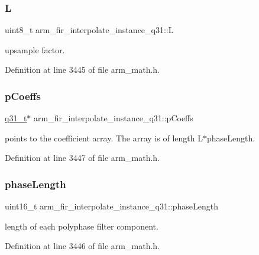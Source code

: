 \subsubsection{\texorpdfstring{L}{L}}
{\footnotesize\ttfamily uint8\+\_\+t arm\+\_\+fir\+\_\+interpolate\+\_\+instance\+\_\+q31\+::L}

upsample factor. 

Definition at line 3445 of file arm\+\_\+math.\+h.

\mbox{\label{structarm__fir__interpolate__instance__q31_afa719433687e1936ec3403d0d32f06e6}} 
\subsubsection{\texorpdfstring{p\+Coeffs}{pCoeffs}}
{\footnotesize\ttfamily \hyperlink{arm__math_8h_adc89a3547f5324b7b3b95adec3806bc0}{q31\+\_\+t}$\ast$ arm\+\_\+fir\+\_\+interpolate\+\_\+instance\+\_\+q31\+::p\+Coeffs}

points to the coefficient array. The array is of length L$\ast$phase\+Length. 

Definition at line 3447 of file arm\+\_\+math.\+h.

\mbox{\label{structarm__fir__interpolate__instance__q31_a5d243796584afc7cd6c557f00b7acca5}} 
\subsubsection{\texorpdfstring{phase\+Length}{phaseLength}}
{\footnotesize\ttfamily uint16\+\_\+t arm\+\_\+fir\+\_\+interpolate\+\_\+instance\+\_\+q31\+::phase\+Length}

length of each polyphase filter component. 

Definition at line 3446 of file arm\+\_\+math.\+h.

